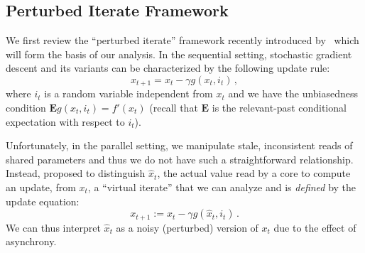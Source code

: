 \documentclass[twoside, 11pt]{article}
\newcommand{\stepsize}{\gamma}
\newcommand{\Econd}{\mathbf{E}}
\begin{document}
\subsection{Perturbed Iterate Framework}
We first review the ``perturbed iterate'' framework recently introduced by~\citet{mania} which will form the basis of our analysis.
In the sequential setting, stochastic gradient descent and its variants can be characterized by the following update rule:
\begin{equation}
x_{t+1} = x_t -\stepsize g(x_t, i_t)\,,
\end{equation}
where $i_t$ is a random variable independent from $x_t$ and we have the unbiasedness condition $\Econd g(x_t, i_t) = f'(x_t)$ (recall that $\Econd$ is the relevant-past conditional expectation with respect to $i_t$).

Unfortunately, in the parallel setting, we manipulate stale, inconsistent reads of shared parameters and thus we do not have such a straightforward relationship.
Instead, \citet{mania} proposed to distinguish $\hat x_t$, the actual value read by a core to compute an update, from $x_t$, a ``virtual iterate'' that we can analyze and is \emph{defined} by the update equation:
\begin{equation}\label{eq:sgdupdate}
x_{t+1} := x_t -\stepsize g(\hat x_t, i_t)\,.
\end{equation}
We can thus interpret $\hat x_t$ as a noisy (perturbed) version of $x_t$ due to the effect of asynchrony.
\end{document}
